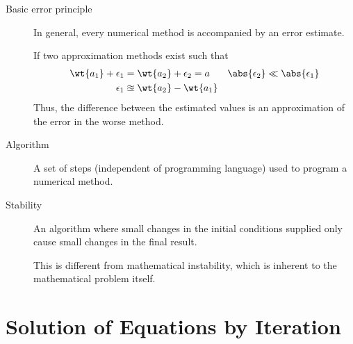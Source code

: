 \begin{description}
    \item[Basic error principle] In general, every numerical method is accompanied by
        an error estimate. \par
        If two approximation methods exist such that
        \begin{align}
            \wt{a_1} + \epsilon_1 & = \wt{a_2} + \epsilon_2 = a &
            \abs{\epsilon_2}      & \ll \abs{\epsilon_1}          \\
            \epsilon_1            & \approxeq \wt{a_2} -
            \wt{a_1}
        \end{align}
        Thus, the difference between the estimated values is an approximation of the
        error in the worse method.

    \item[Algorithm] A set of steps (independent of programming language) used to
        program a numerical method.

    \item[Stability] An algorithm where small changes in the initial conditions supplied
        only cause small changes in the final result. \par
        This is different from mathematical instability, which is inherent to the
        mathematical problem itself.

\end{description}

\section{Solution of Equations by Iteration}

